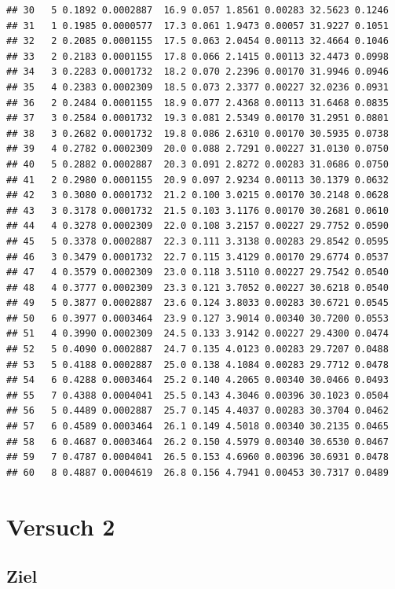 \documentclass[
]{article}
\begin{document}
\begin{verbatim}
## 30   5 0.1892 0.0002887  16.9 0.057 1.8561 0.00283 32.5623 0.1246
## 31   1 0.1985 0.0000577  17.3 0.061 1.9473 0.00057 31.9227 0.1051
## 32   2 0.2085 0.0001155  17.5 0.063 2.0454 0.00113 32.4664 0.1046
## 33   2 0.2183 0.0001155  17.8 0.066 2.1415 0.00113 32.4473 0.0998
## 34   3 0.2283 0.0001732  18.2 0.070 2.2396 0.00170 31.9946 0.0946
## 35   4 0.2383 0.0002309  18.5 0.073 2.3377 0.00227 32.0236 0.0931
## 36   2 0.2484 0.0001155  18.9 0.077 2.4368 0.00113 31.6468 0.0835
## 37   3 0.2584 0.0001732  19.3 0.081 2.5349 0.00170 31.2951 0.0801
## 38   3 0.2682 0.0001732  19.8 0.086 2.6310 0.00170 30.5935 0.0738
## 39   4 0.2782 0.0002309  20.0 0.088 2.7291 0.00227 31.0130 0.0750
## 40   5 0.2882 0.0002887  20.3 0.091 2.8272 0.00283 31.0686 0.0750
## 41   2 0.2980 0.0001155  20.9 0.097 2.9234 0.00113 30.1379 0.0632
## 42   3 0.3080 0.0001732  21.2 0.100 3.0215 0.00170 30.2148 0.0628
## 43   3 0.3178 0.0001732  21.5 0.103 3.1176 0.00170 30.2681 0.0610
## 44   4 0.3278 0.0002309  22.0 0.108 3.2157 0.00227 29.7752 0.0590
## 45   5 0.3378 0.0002887  22.3 0.111 3.3138 0.00283 29.8542 0.0595
## 46   3 0.3479 0.0001732  22.7 0.115 3.4129 0.00170 29.6774 0.0537
## 47   4 0.3579 0.0002309  23.0 0.118 3.5110 0.00227 29.7542 0.0540
## 48   4 0.3777 0.0002309  23.3 0.121 3.7052 0.00227 30.6218 0.0540
## 49   5 0.3877 0.0002887  23.6 0.124 3.8033 0.00283 30.6721 0.0545
## 50   6 0.3977 0.0003464  23.9 0.127 3.9014 0.00340 30.7200 0.0553
## 51   4 0.3990 0.0002309  24.5 0.133 3.9142 0.00227 29.4300 0.0474
## 52   5 0.4090 0.0002887  24.7 0.135 4.0123 0.00283 29.7207 0.0488
## 53   5 0.4188 0.0002887  25.0 0.138 4.1084 0.00283 29.7712 0.0478
## 54   6 0.4288 0.0003464  25.2 0.140 4.2065 0.00340 30.0466 0.0493
## 55   7 0.4388 0.0004041  25.5 0.143 4.3046 0.00396 30.1023 0.0504
## 56   5 0.4489 0.0002887  25.7 0.145 4.4037 0.00283 30.3704 0.0462
## 57   6 0.4589 0.0003464  26.1 0.149 4.5018 0.00340 30.2135 0.0465
## 58   6 0.4687 0.0003464  26.2 0.150 4.5979 0.00340 30.6530 0.0467
## 59   7 0.4787 0.0004041  26.5 0.153 4.6960 0.00396 30.6931 0.0478
## 60   8 0.4887 0.0004619  26.8 0.156 4.7941 0.00453 30.7317 0.0489
\end{verbatim}

\hypertarget{versuch-2}{%
\section{Versuch 2}\label{versuch-2}}

\hypertarget{ziel-1}{%
\subsection{Ziel}\label{ziel-1}}
\end{document}
